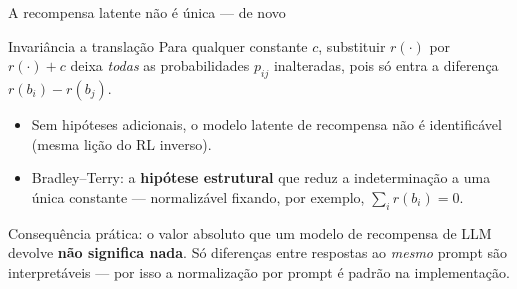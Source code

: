 \documentclass[aspectratio=169, 11pt]{beamer}
\begin{document}
\begin{frame}{A recompensa latente não é única --- de novo}

  \begin{teobox}{Invariância a translação}
    Para qualquer constante $c$, substituir $r(\cdot)$ por $r(\cdot) + c$ deixa
    \emph{todas} as probabilidades $p_{ij}$ inalteradas, pois só entra a
    diferença $r(b_i) - r(b_j)$.
  \end{teobox}

  \begin{itemize}\setlength{\itemsep}{0.3ex}
    \item Sem hipóteses adicionais, o modelo latente de recompensa não é
      identificável (mesma lição do RL inverso).
    \item Bradley--Terry: a \textbf{hipótese estrutural} que reduz a
      indeterminação a uma única constante --- normalizável fixando, por
      exemplo, $\sum_i r(b_i) = 0$.
  \end{itemize}

  \begin{alertabox}
    Consequência prática: o valor absoluto que um modelo de recompensa de LLM
    devolve \textbf{não significa nada}. Só diferenças entre respostas ao
    \emph{mesmo} prompt são interpretáveis --- por isso a normalização por
    prompt é padrão na implementação.
  \end{alertabox}
\end{frame}
\end{document}
